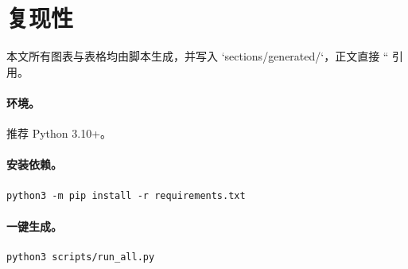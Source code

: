 \section{复现性}\label{app:reproducibility}

本文所有图表与表格均由脚本生成，并写入 `sections/generated/`，正文直接 `` 引用。

\paragraph{环境。}
推荐 Python 3.10+。

\paragraph{安装依赖。}
\begin{verbatim}
python3 -m pip install -r requirements.txt
\end{verbatim}

\paragraph{一键生成。}
\begin{verbatim}
python3 scripts/run_all.py
\end{verbatim}

